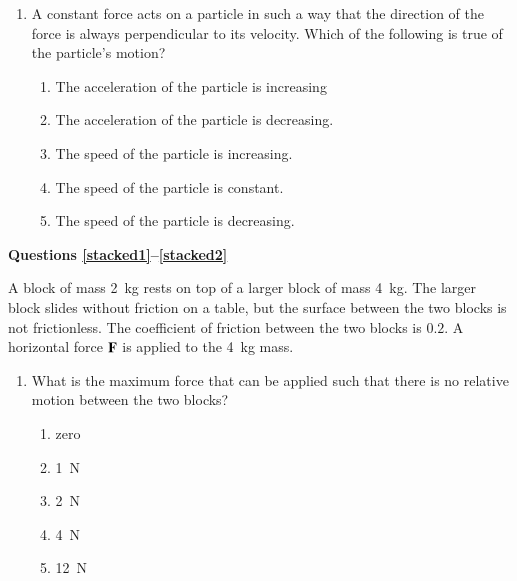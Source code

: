 \documentclass{../../oss-apphys}
\begin{document}
\begin{multicols}{2}
\begin{enumerate}[resume,leftmargin=18pt]
  \item A constant force acts on a particle in such a way that the direction of
    the force is always perpendicular to its velocity. Which of the
    following is true of the particle's motion?
    \begin{enumerate}[noitemsep,topsep=0pt,leftmargin=18pt,label=(\Alph*)]
    \item The acceleration of the particle is increasing
    \item The acceleration of the particle is decreasing.
    \item The speed of the particle is increasing.
    \item The speed of the particle is constant.
    \item The speed of the particle is decreasing.
    \end{enumerate}

  \end{enumerate}
  \columnbreak
  
  \textbf{Questions \ref{stacked1}--\ref{stacked2}}

  A block of mass \SI{2}{\kilo\gram} rests on top of a larger block of mass
  \SI{4}{\kilo\gram}. The larger block slides without friction on a table, but
  the surface between the two blocks is not frictionless. The coefficient of
  friction between the two blocks is $0.2$. A horizontal force $\mathbf{F}$ is
  applied to the \SI{4}{\kilo\gram} mass.
  \begin{enumerate}[resume,leftmargin=18pt]
  \item What is the maximum force that can be applied such that there is no
    relative motion between the two blocks?
    \begin{enumerate}[noitemsep,topsep=0pt,leftmargin=18pt,label=(\Alph*)]
    \item zero
    \item \SI{1}{\newton}
    \item \SI{2}{\newton}
    \item \SI{4}{\newton}
    \item \SI{12}{\newton}
    \end{enumerate}
    \label{stacked1}
    

\end{enumerate}
\end{multicols}
\end{document}
